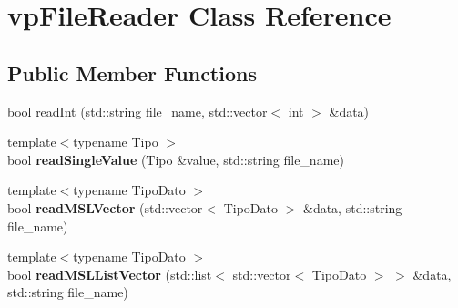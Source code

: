 \hypertarget{classvpFileReader}{}\section{vp\+File\+Reader Class Reference}
\label{classvpFileReader}
\subsection*{Public Member Functions}
\begin{DoxyCompactItemize}
\item 
bool \hyperlink{classvpFileReader_acb94e641bcb9efba7155f428a698fe03}{read\+Int} (std\+::string file\+\_\+name, std\+::vector$<$ int $>$ \&data)
\item 
{\footnotesize template$<$typename Tipo $>$ }\\bool {\bfseries read\+Single\+Value} (Tipo \&value, std\+::string file\+\_\+name)\hypertarget{classvpFileReader_afdd319189e19f90738f8597f3634a775}{}\label{classvpFileReader_afdd319189e19f90738f8597f3634a775}

\item 
{\footnotesize template$<$typename Tipo\+Dato $>$ }\\bool {\bfseries read\+M\+S\+L\+Vector} (std\+::vector$<$ Tipo\+Dato $>$ \&data, std\+::string file\+\_\+name)\hypertarget{classvpFileReader_a5d886b245c6339689edd5cdf22d2799f}{}\label{classvpFileReader_a5d886b245c6339689edd5cdf22d2799f}

\item 
{\footnotesize template$<$typename Tipo\+Dato $>$ }\\bool {\bfseries read\+M\+S\+L\+List\+Vector} (std\+::list$<$ std\+::vector$<$ Tipo\+Dato $>$ $>$ \&data, std\+::string file\+\_\+name)\hypertarget{classvpFileReader_a05c2f9d78b751ad28c0683372ca97ace}{}\label{classvpFileReader_a05c2f9d78b751ad28c0683372ca97ace}


\end{DoxyCompactItemize}
